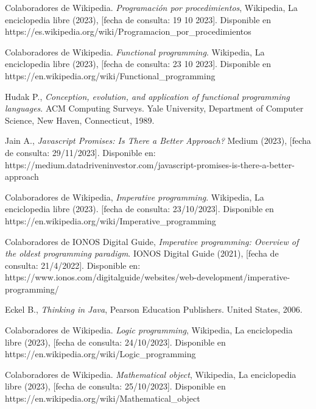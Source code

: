 \begin{thebibliography}{11}
    \bibitem{}
    \label{sec:50}
    \hypertarget{50}{}
    Colaboradores de Wikipedia. \textit{Programación por procedimientos}, Wikipedia, La enciclopedia libre (2023), [fecha de consulta: 19 10 2023]. Disponible en https://es.wikipedia.org/wiki/Programacion\_por\_procedimientos

    \bibitem{}
    \label{sec:51}
    \hypertarget{51}{}
    Colaboradores de Wikipedia. \textit{Functional programming}. Wikipedia, La enciclopedia libre (2023), [fecha de consulta: 23 10 2023]. Disponible en https://en.wikipedia.org/wiki/Functional\_programming
    
    \bibitem{}
    \label{sec:52}
    \hypertarget{52}{}
    Hudak P., \textit{Conception, evolution, and application of functional programming languages}. ACM Computing Surveys. Yale University, Department of Computer Science, New Haven, Connecticut, 1989. %

    \bibitem{}
    \label{sec:53}
    \hypertarget{53}{}
    Jain A.,  \textit{Javascript Promises: Is There a Better Approach?} Medium (2023), [fecha de consulta: 29/11/2023]. Disponible en: https://medium.datadriveninvestor.com/javascript-promises-is-there-a-better-approach

    \bibitem{}
    \label{sec:54}
    \hypertarget{54}{}
    Colaboradores de Wikipedia, \textit{Imperative programming}. Wikipedia, La enciclopedia libre (2023). [fecha de consulta: 23/10/2023]. Disponible en https://en.wikipedia.org/wiki/Imperative\_programming

    \bibitem{}
    \label{sec:55}
    \hypertarget{55}{}
    Colaboradores de IONOS Digital Guide, \textit{Imperative programming: Overview of the oldest programming paradigm}. IONOS Digital Guide (2021), [fecha de consulta: 21/4/2022]. Disponible en: https://www.ionos.com/digitalguide/websites/web-development/imperative-programming/

    \bibitem{}
    \label{sec:56}
    \hypertarget{56}{}
    Eckel B.,  \textit{Thinking in Java}, Pearson Education Publishers. United States, 2006. %

    \bibitem{}
    \label{sec:57}
    \hypertarget{57}{}
    Colaboradores de Wikipedia. \textit{Logic programming}, Wikipedia, La enciclopedia libre (2023), [fecha de consulta: 24/10/2023]. Disponible en https://en.wikipedia.org/wiki/Logic\_programming

    \bibitem{}
    \label{sec:58}
    \hypertarget{58}{}
    Colaboradores de Wikipedia. \textit{Mathematical object}, Wikipedia, La enciclopedia libre (2023), [fecha de consulta: 25/10/2023]. Disponible en https://en.wikipedia.org/wiki/Mathematical\_object


\end{thebibliography}
